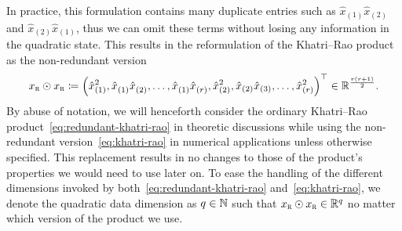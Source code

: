 In practice, this formulation contains many duplicate entries such as $\hat{x}_{(1)}^{\phantom{1}} \hat{x}_{(2)}^{\phantom{1}}$ and $\hat{x}_{(2)}^{\phantom{1}} \hat{x}_{(1)}^{\phantom{1}}$, thus we can omit these terms without losing any information in the quadratic state.
This results in the reformulation of the Khatri--Rao product as the non-redundant version
\begin{equation}\label{eq:khatri-rao}
    x_{\textnormal{\scshape r}} \odot x_{\textnormal{\scshape r}} \coloneqq {\left( \hat{x}_{(1)}^2, \hat{x}_{(1)}^{\phantom{1}} \hat{x}_{(2)}^{\phantom{1}}, \dots, \hat{x}_{(1)}^{\phantom{1}} \hat{x}_{(r)}^{\phantom{1}}, \hat{x}_{(2)}^2, \hat{x}_{(2)} \hat{x}_{(3)}, \dots, \hat{x}_{(r)}^2 \right)}^{\top} \in \mathbb{R}^{\frac{r (r + 1)}{2}}.
\end{equation}
By abuse of notation, we will henceforth consider the ordinary Khatri--Rao product~\eqref{eq:redundant-khatri-rao} in theoretic discussions while using the non-redundant version~\eqref{eq:khatri-rao} in numerical applications unless otherwise specified.
This replacement results in no changes to those of the product's properties we would need to use later on.
To ease the handling of the different dimensions invoked by both~\eqref{eq:redundant-khatri-rao} and~\eqref{eq:khatri-rao}, we denote the quadratic data dimension as $q \in \mathbb{N}$ such that $x_{\textnormal{\scshape r}} \odot x_{\textnormal{\scshape r}} \in \mathbb{R}^q$ no matter which version of the product we use.

